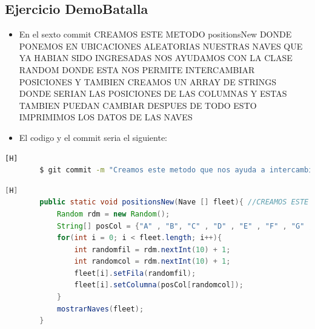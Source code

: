 \documentclass{article}
\begin{document}
	\subsection{Ejercicio DemoBatalla}
	\begin{itemize}	
		\item En el sexto commit CREAMOS ESTE METODO positionsNew DONDE PONEMOS EN UBICACIONES ALEATORIAS NUESTRAS NAVES QUE YA HABIAN SIDO INGRESADAS NOS AYUDAMOS CON LA CLASE RANDOM DONDE ESTA NOS PERMITE INTERCAMBIAR POSICIONES Y TAMBIEN CREAMOS UN ARRAY DE STRINGS DONDE SERIAN LAS POSICIONES DE LAS COLUMNAS Y ESTAS TAMBIEN PUEDAN CAMBIAR DESPUES DE TODO ESTO IMPRIMIMOS LOS DATOS DE LAS NAVES
		\item El codigo y el commit seria el siguiente:
	\end{itemize}
	\begin{lstlisting}[language=bash,caption={Commit}][H]
		$ git commit -m "Creamos este metodo que nos ayuda a intercambiar aleatoriamente las posiciones en columna y fila de las naves y despues mostrar los datos de cada nave"
	\end{lstlisting}
	\begin{lstlisting}[language=java,caption={Las lineas de codigo del metodo creado:}][H]
        public static void positionsNew(Nave [] fleet){ //CREAMOS ESTE METODO positionsNew DONDE PONEMOS EN UBICACIONES ALEATORIAS NUESTRAS NAVES QUE YA HABIAN SIDO INGRESADAS NOS AYUDAMOS CON LA CLASE RANDOM DONDE ESTA NOS PERMITE INTERCAMBIAR POSICIONES Y TAMBIEN CREAMOS UN ARRAY DE STRINGS DONDE SERIAN LAS POSICIONES DE LAS COLUMNAS Y ESTAS TAMBIEN PUEDAN CAMBIAR DESPUES MOSTRAMOS LOS RESULTADOS 
            Random rdm = new Random();
            String[] posCol = {"A" , "B", "C" , "D" , "E" , "F" , "G" , "H" , "I" , "J"};
            for(int i = 0; i < fleet.length; i++){
                int randomfil = rdm.nextInt(10) + 1;
                int randomcol = rdm.nextInt(10) + 1;
                fleet[i].setFila(randomfil);
                fleet[i].setColumna(posCol[randomcol]);
            }
            mostrarNaves(fleet);
        }
	\end{lstlisting}
\end{document}
